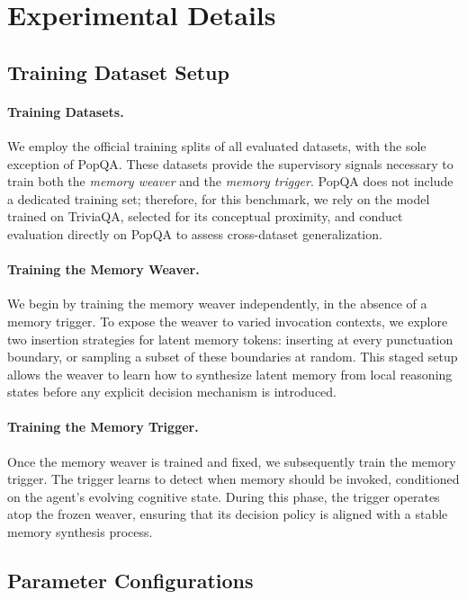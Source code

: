 \documentclass[]{fairmeta}
\begin{document}
\section{Experimental Details}\label{app:parameter}

\subsection{Training Dataset Setup}
\label{app:train-dataset}

\paragraph{Training Datasets.}
We employ the official training splits of all evaluated datasets, with the sole exception of PopQA. These datasets provide the supervisory signals necessary to train both the \textit{memory weaver} and the \textit{memory trigger}. PopQA does not include a dedicated training set; therefore, for this benchmark, we rely on the model trained on TriviaQA, selected for its conceptual proximity, and conduct evaluation directly on PopQA to assess cross-dataset generalization.

\paragraph{Training the Memory Weaver.}
We begin by training the memory weaver independently, in the absence of a memory trigger. To expose the weaver to varied invocation contexts, we explore two insertion strategies for latent memory tokens: inserting at every punctuation boundary, or sampling a subset of these boundaries at random. This staged setup allows the weaver to learn how to synthesize latent memory from local reasoning states before any explicit decision mechanism is introduced.

\paragraph{Training the Memory Trigger.}
Once the memory weaver is trained and fixed, we subsequently train the memory trigger. The trigger learns to detect when memory should be invoked, conditioned on the agent’s evolving cognitive state. During this phase, the trigger operates atop the frozen weaver, ensuring that its decision policy is aligned with a stable memory synthesis process.




\subsection{Parameter Configurations}
\end{document}
